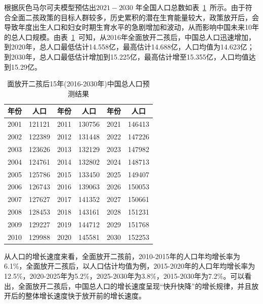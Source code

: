 \documentclass{whutmod}
\begin{document}
  根据灰色马尔可夫模型预估出$ 2021-2030$ 年全国人口总数如表~\ref{biaaddao1}~所示。由于符合全面二孩政策的目标人群较多，历史累积的潜在生育能量较大，政策放开后，会导致年度出生人口和妇女时期生育水平的急剧增加和波动，从而影响中国未来10年的总人口规模。由表~\ref{biaaddao1}~可知，从2016年全面放开二孩后，中国总人口迅速增加，到2020年，总人口最低估计14.558亿，最高估计14.688亿，人口均值为14.623亿；到2030年，总人口最低估计增加到15.225亿，最高估计增至15.355亿，人口均值达到15.29亿。
  
 		\begin{table}[H]
 	\centering		
 	\caption{面放开二孩后15年(2016-2030年)中国总人口预测结果}\label{biaaddao1}
 	\begin{tabular}{cccccc}
 		\toprule[2pt]
 		\multicolumn{1}{m{2cm}}{\centering 年份}
 		& \multicolumn{1}{m{2cm}}{\centering 人口}
 		&\multicolumn{1}{m{2cm}}{\centering 年份}
 		& \multicolumn{1}{m{2cm}}{\centering 人口}
 		&\multicolumn{1}{m{2cm}}{\centering 年份}
 		& \multicolumn{1}{m{2cm}}{\centering 人口}
 		\\
 		\midrule[1pt]
 		2001 & 	121121&2011 &130756&2021 &146413\\ 
 		2002	& 122389 & 2012 &131448 &2022& 147226\\
 		2003&  123626&  2013& 132129&2023& 147982\\
 		2004& 124761 & 2014 &132802 &2024&148713 \\
 		2005	&125786  & 2015 & 133450&2025& 149407\\
 		2006&126743  & 2016 &139063  &2026&150053\\
 		2007& 127627 & 2017 &141352&2027&150661\\
 		2008&128453  & 2018 & 143161&2028& 151231\\
 		2009&  129227&  2019& 144712&2029& 151768\\
 		2010 & 	129988&2020 &145581&2030& 152253\\ 
 		\bottomrule[2pt]	
 	\end{tabular}
 \end{table}
 
  从人口的增长速度来看，全面放开二孩前，2010-2015年的人口年均增长率为6.1\%，全面放开二孩后，以人口估计均值为例，2015-2020年的人口年均增长率为12.5\%，2020-2025年为5.2\%，2025-2030年为3.8\%，2015-2030年为7.2\%。可以看出，全面放开二孩后，中国总人口的增长速度呈现“快升快降”的增长规律，并且放开后的整体增长速度快于放开前的增长速度。

  
  
\end{document}
